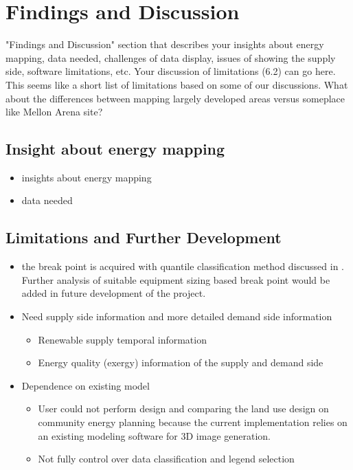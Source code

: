 
\chapter{Findings and Discussion} %

\label{Chapter7} %


"Findings and Discussion" section that describes your insights about
energy mapping, data needed, challenges of data display, issues of
showing the supply side, software limitations, etc. Your discussion of
limitations (6.2) can go here.  This seems like a short list of
limitations based on some of our discussions.  What about the
differences between mapping largely developed areas versus someplace
like Mellon Arena site?

\section{Insight about energy mapping}
\begin{itemize}
\item insights about energy mapping
\item data needed
\end{itemize}
\section{Limitations and Further Development}
\begin{itemize}
\item the break point is acquired with quantile classification method
  discussed in . Further analysis of suitable
  equipment sizing based break point would be added in future
  development of the project.

  \item Need supply side information and more detailed demand side
    information
  \begin{itemize}
  \item Renewable supply temporal information
  \item Energy quality (exergy) information of the supply and demand
    side
  \end{itemize}
\item Dependence on existing model
  \begin{itemize}
  \item User could not perform design and comparing the land use
    design on community energy planning because the current
    implementation relies on an existing modeling software for 3D
    image generation.
  \item Not fully control over data classification and legend selection
  \end{itemize}
\end{itemize}
